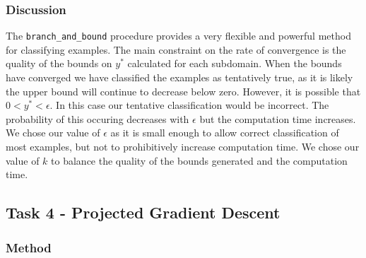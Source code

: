 \documentclass[11pt]{article}
\begin{document}

\subsubsection{Discussion}
The \texttt{branch\_and\_bound} procedure provides a very flexible and powerful method for classifying examples. 
The main constraint on the rate of convergence is the quality of the bounds on $y^*$ calculated for each subdomain.
When the bounds have converged we have classified the examples as tentatively true, as it is likely the upper bound will continue to decrease below zero. 
However, it is possible that $0<y^*<\epsilon$.
In this case our tentative classification would be incorrect. 
The probability of this occuring decreases with $\epsilon$ but the computation time increases.
We chose our value of $\epsilon$ as it is small enough to allow correct classification of most examples, but not to prohibitively increase computation time. 
We chose our value of $k$ to balance the quality of the bounds generated and the computation time.


\subsection{Task 4 - Projected Gradient Descent}
\subsubsection{Method}
\end{document}

